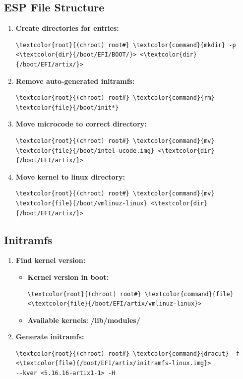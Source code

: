 \documentclass[10pt, a4paper, onecolumn, oneside, titlepage, openany]{book}
\begin{document}
\subsection{ESP File Structure}
\begin{enumerate}
    \item \textbf{Create directories for entries:}
\begin{Verbatim}[commandchars=\\\{\}]
\textcolor{root}{(chroot) root#} \textcolor{command}{mkdir} -p <\textcolor{dir}{/boot/EFI/BOOT/}> <\textcolor{dir}{/boot/EFI/artix/}>
\end{Verbatim}
    \item \textbf{Remove auto-generated initramfs:}
\begin{Verbatim}[commandchars=\\\{\}]
\textcolor{root}{(chroot) root#} \textcolor{command}{rm} \textcolor{file}{/boot/init*}
\end{Verbatim}
    \item \textbf{Move microcode to correct directory:}
\begin{Verbatim}[commandchars=\\\{\}]
\textcolor{root}{(chroot) root#} \textcolor{command}{mv} \textcolor{file}{/boot/intel-ucode.img} <\textcolor{dir}{/boot/EFI/artix/}>
\end{Verbatim}
    \item \textbf{Move kernel to linux directory:}
\begin{Verbatim}[commandchars=\\\{\}]
\textcolor{root}{(chroot) root#} \textcolor{command}{mv} \textcolor{file}{/boot/vmlinuz-linux} <\textcolor{dir}{/boot/EFI/artix/}>
\end{Verbatim}
\end{enumerate}
\subsection{Initramfs}
\begin{enumerate}
    \item \textbf{Find kernel version:}
    \begin{itemize}
        \item \textbf{Kernel version in boot:}
\begin{Verbatim}[commandchars=\\\{\}]
\textcolor{root}{(chroot) root#} \textcolor{command}{file} <\textcolor{file}{/boot/EFI/artix/vmlinuz-linux}>
\end{Verbatim}
        \item \textbf{Available kernels:}
\newline \textbf{\textcolor{dir}{/lib/modules/}}
    \end{itemize}
    \item \textbf{Generate initramfs:}
\begin{Verbatim}[commandchars=\\\{\}]
\textcolor{root}{(chroot) root#} \textcolor{command}{dracut} -f <\textcolor{file}{/boot/EFI/artix/initramfs-linux.img}>
--kver <5.16.16-artix1-1> -H
\end{Verbatim}
\end{enumerate}
\end{document}
